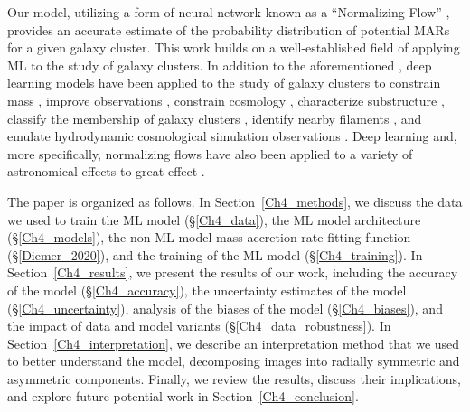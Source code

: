 Our model, utilizing a form of neural network known as a  ``Normalizing Flow'' \cite{Papamakarios_2019}, provides an accurate estimate of the probability distribution of potential MARs for a given galaxy cluster. This work builds on a well-established field of applying ML to the study of galaxy clusters. In addition to the aforementioned \cite{Arendt_2024}, deep learning models have been applied to the study of galaxy clusters to constrain mass \cite{Ntampaka2019, Ho_2023, Krippendorf_2024}, improve observations \cite{Soltis_2022}, constrain cosmology \cite{Qiu_2024}, characterize substructure \cite{Henriksen_2024}, classify the membership of galaxy clusters \cite{Farid2023}, identify nearby filaments \cite{Weaver_2023}, and emulate hydrodynamic cosmological simulation observations \cite{Rothschild_2022}. Deep learning and, more specifically, normalizing flows have also been applied to a variety of astronomical effects to great effect \cite[e.g.,][]{Sweere_2022}.

The paper is organized as follows. In Section~\ref{Ch4_methods}, we discuss the data we used to train the ML model (\S\ref{Ch4_data}), the ML model architecture (\S\ref{Ch4_models}), the non-ML model mass accretion rate fitting function (\S\ref{Diemer_2020}), and the training of the ML model (\S\ref{Ch4_training}). In Section~\ref{Ch4_results}, we present the results of our work, including the accuracy of the model (\S\ref{Ch4_accuracy}), the uncertainty estimates of the model (\S\ref{Ch4_uncertainty}), analysis of the biases of the model (\S\ref{Ch4_biases}), and the impact of data and model variants (\S\ref{Ch4_data_robustness}). In Section~\ref{Ch4_interpretation}, we describe an interpretation method that we used to better understand the model, decomposing images into radially symmetric and asymmetric components. Finally, we review the results, discuss their implications, and explore future potential work in Section~\ref{Ch4_conclusion}.

